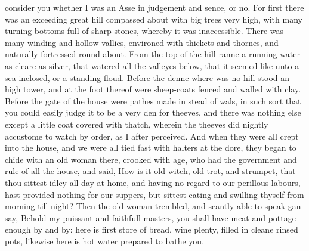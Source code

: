consider you whether I was an Asse in judgement and sence, or no. For first
there was an exceeding great hill compassed about with big trees very high,
with many turning bottoms full of sharp stones, whereby it was inaccessible.
There was many winding and hollow vallies, environed with thickets and thornes,
and naturally fortressed round about. From the top of the hill ranne a running
water as cleare as silver, that watered all the valleyes below, that it seemed
like unto a sea inclosed, or a standing floud. Before the denne where was no
hill stood an high tower, and at the foot thereof were sheep-coats fenced and
walled with clay. Before the gate of the house were pathes made in stead of
wals, in such sort that you could easily judge it to be a very den for theeves,
and there was nothing else except a little coat covered with thatch, wherein
the theeves did nightly accustome to watch by order, as I after perceived. And
when they were all crept into the house, and we were all tied fast with halters
at the dore, they began to chide with an old woman there, crooked with age, who
had the government and rule of all the house, and said, How is it old witch,
old trot, and strumpet, that thou sittest idley all day at home, and having no
regard to our perillous labours, hast provided nothing for our suppers, but
sittest eating and swilling thyself from morning till night? Then the old woman
trembled, and scantly able to speak gan say, Behold my puissant and faithfull
masters, you shall have meat and pottage enough by and by: here is first store
of bread, wine plenty, filled in cleane rinsed pots, likewise here is hot water
prepared to bathe you.

